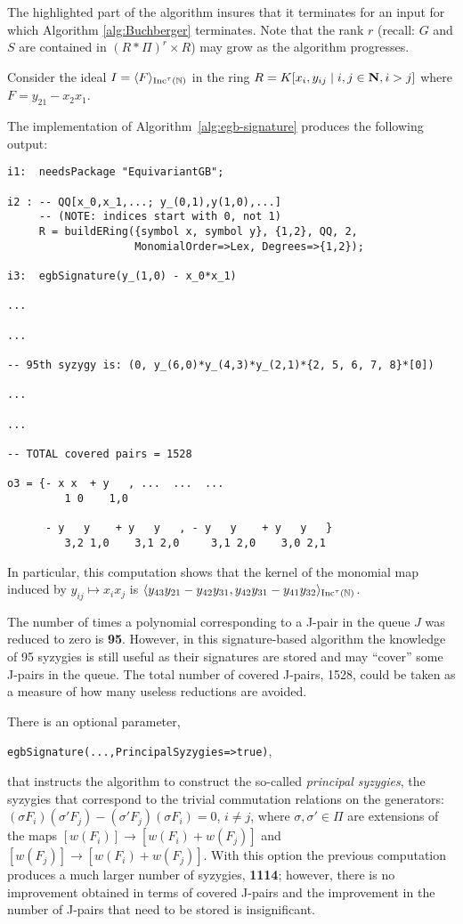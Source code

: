 The highlighted part of the algorithm insures that it terminates for an input for which Algorithm \ref{alg:Buchberger} terminates.
Note that the rank $r$ (recall: $G$ and $S$ are contained in $(R*\Pi)^r\times R$) may grow as the algorithm progresses. 

\begin{example}
Consider the ideal $I = \langle F \rangle_{\operatorname{Inc}^\tau(\mathbb N)}$ in the ring $R=K[x_i, y_{ij}\mid i,j\in\mathbf N, i>j]$ where $F = y_{21}-x_2x_1$.

The implementation of Algorithm~\ref{alg:egb-signature} produces the following output:
\begin{M2}
\begin{verbatim}
i1:  needsPackage "EquivariantGB";

i2 : -- QQ[x_0,x_1,...; y_(0,1),y(1,0),...] 
     -- (NOTE: indices start with 0, not 1)
     R = buildERing({symbol x, symbol y}, {1,2}, QQ, 2, 
                    MonomialOrder=>Lex, Degrees=>{1,2});

i3:  egbSignature(y_(1,0) - x_0*x_1)

...

...

-- 95th syzygy is: (0, y_(6,0)*y_(4,3)*y_(2,1)*{2, 5, 6, 7, 8}*[0])

...

...

-- TOTAL covered pairs = 1528
                     
o3 = {- x x  + y   , ...  ...  ...
         1 0    1,0  

      - y   y    + y   y   , - y   y    + y   y   }
         3,2 1,0    3,1 2,0     3,1 2,0    3,0 2,1
\end{verbatim}
\end{M2}  

In particular, this computation shows that the kernel of the monomial map induced by $y_{ij}\mapsto x_ix_j$ is 
$\langle y_{43}y_{21}-y_{42}y_{31},y_{42}y_{31}-y_{41}y_{32} \rangle_{\operatorname{Inc}^\tau(\mathbb N)}$.

The number of times a polynomial corresponding to a J-pair in the queue $J$ was reduced to zero is {\bf 95}. However, in this signature-based algorithm the knowledge of 95 syzygies is still useful as their signatures are stored and may ``cover'' some J-pairs in the queue. The total number of covered J-pairs, 1528, could be taken as a measure of how many useless reductions are avoided.

There is an optional parameter, \begin{center} \verb|egbSignature(...,PrincipalSyzygies=>true)|,\end{center} that instructs the algorithm to construct the so-called \emph{principal syzygies}, the syzygies that correspond to the trivial commutation relations on the generators: $(\sigma F_i) (\sigma' F_j)-(\sigma'F_j)(\sigma F_i)=0$, $i\neq j$, where $\sigma,\sigma'\in\Pi$ are extensions of the maps $[w(F_i)] \to [w(F_i) + w(F_j)]$ and $ [w(F_j)] \to [w(F_i) + w(F_j)]$.
With this option the previous computation produces a much larger number of syzygies, {\bf 1114}; however, there is no improvement obtained in terms of covered J-pairs and the improvement in the number of J-pairs that need to be stored is insignificant. 


\end{example}
